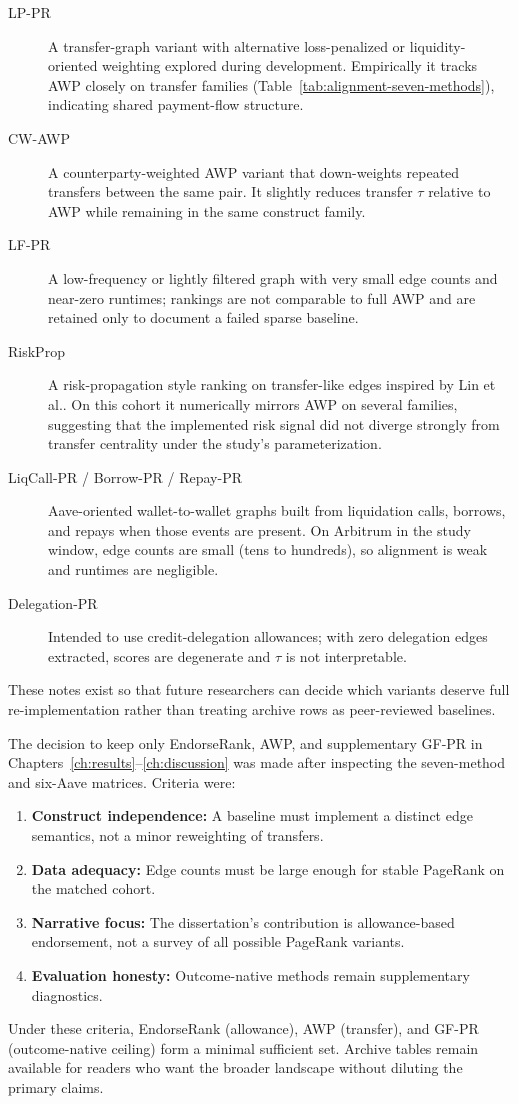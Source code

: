 \begin{description}
\item[LP-PR] A transfer-graph variant with alternative loss-penalized or liquidity-oriented weighting explored during development. Empirically it tracks AWP closely on transfer families (Table~\ref{tab:alignment-seven-methods}), indicating shared payment-flow structure.
\item[CW-AWP] A counterparty-weighted AWP variant that down-weights repeated transfers between the same pair. It slightly reduces transfer $\tau$ relative to AWP while remaining in the same construct family.
\item[LF-PR] A low-frequency or lightly filtered graph with very small edge counts and near-zero runtimes; rankings are not comparable to full AWP and are retained only to document a failed sparse baseline.
\item[RiskProp] A risk-propagation style ranking on transfer-like edges inspired by Lin et al.. On this cohort it numerically mirrors AWP on several families, suggesting that the implemented risk signal did not diverge strongly from transfer centrality under the study's parameterization.
\item[LiqCall-PR / Borrow-PR / Repay-PR] Aave-oriented wallet-to-wallet graphs built from liquidation calls, borrows, and repays when those events are present. On Arbitrum in the study window, edge counts are small (tens to hundreds), so alignment is weak and runtimes are negligible.
\item[Delegation-PR] Intended to use credit-delegation allowances; with zero delegation edges extracted, scores are degenerate and $\tau$ is not interpretable.
\end{description}

These notes exist so that future researchers can decide which variants deserve full re-implementation rather than treating archive rows as peer-reviewed baselines.


The decision to keep only EndorseRank, AWP, and supplementary GF-PR in Chapters~\ref{ch:results}--\ref{ch:discussion} was made after inspecting the seven-method and six-Aave matrices. Criteria were:

\begin{enumerate}
\item \textbf{Construct independence:} A baseline must implement a distinct edge semantics, not a minor reweighting of transfers.
\item \textbf{Data adequacy:} Edge counts must be large enough for stable PageRank on the matched cohort.
\item \textbf{Narrative focus:} The dissertation's contribution is allowance-based endorsement, not a survey of all possible PageRank variants.
\item \textbf{Evaluation honesty:} Outcome-native methods remain supplementary diagnostics.
\end{enumerate}

Under these criteria, EndorseRank (allowance), AWP (transfer), and GF-PR (outcome-native ceiling) form a minimal sufficient set. Archive tables remain available for readers who want the broader landscape without diluting the primary claims.

